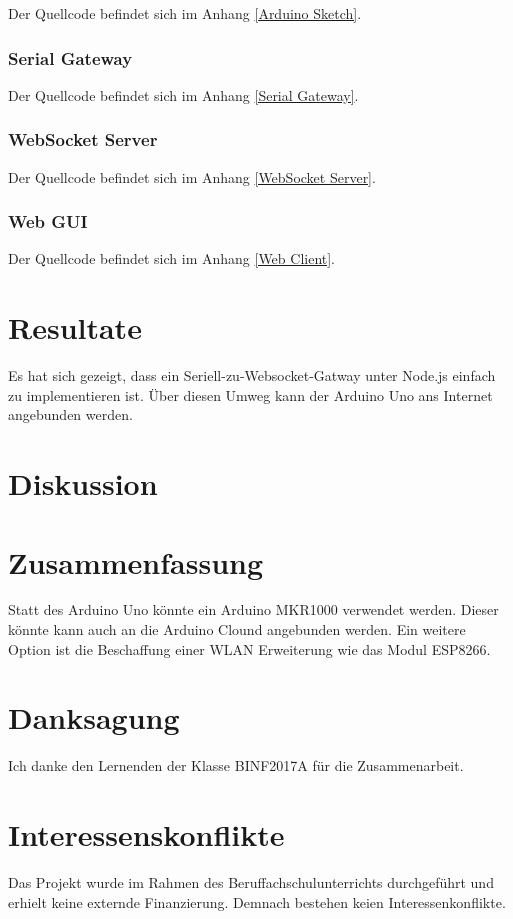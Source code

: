 Der Quellcode befindet sich im Anhang \ref{Arduino Sketch}.

\hypertarget{serial-gateway-1}{%
\subsubsection{Serial Gateway}\label{serial-gateway-1}}

Der Quellcode befindet sich im Anhang \ref{Serial Gateway}.

\hypertarget{websocket-server}{%
\subsubsection{WebSocket Server}\label{websocket-server}}

Der Quellcode befindet sich im Anhang \ref{WebSocket Server}.

\hypertarget{web-gui}{%
\subsubsection{Web GUI}\label{web-gui}}

Der Quellcode befindet sich im Anhang \ref{Web Client}.

\hypertarget{resultate}{%
\section{Resultate}\label{resultate}}

Es hat sich gezeigt, dass ein Seriell-zu-Websocket-Gatway unter Node.js
einfach zu implementieren ist. Über diesen Umweg kann der Arduino Uno
ans Internet angebunden werden.

\hypertarget{diskussion}{%
\section{Diskussion}\label{diskussion}}

\hypertarget{zusammenfassung}{%
\section{Zusammenfassung}\label{zusammenfassung}}

Statt des Arduino Uno könnte ein Arduino MKR1000 verwendet werden.
Dieser könnte kann auch an die Arduino Clound angebunden werden. Ein
weitere Option ist die Beschaffung einer WLAN Erweiterung wie das Modul
ESP8266.

\hypertarget{danksagung}{%
\section{Danksagung}\label{danksagung}}

Ich danke den Lernenden der Klasse BINF2017A für die Zusammenarbeit.

\hypertarget{interessenskonflikte}{%
\section{Interessenskonflikte}\label{interessenskonflikte}}

Das Projekt wurde im Rahmen des Beruffachschulunterrichts durchgeführt
und erhielt keine externde Finanzierung. Demnach bestehen keien
Interessenkonflikte.
